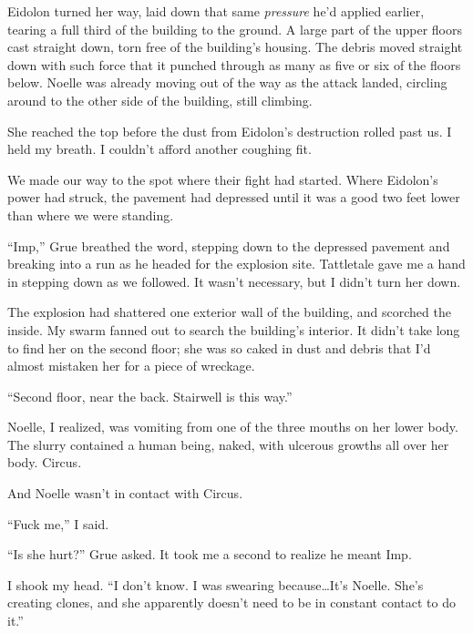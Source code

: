 Eidolon turned her way, laid down that same \emph{pressure }he'd applied earlier, tearing a full  third of the building to the ground.  A large part of the upper floors cast straight down, torn free of the building's housing.  The debris moved straight down with such force that it punched through as many as five or six of the floors below.  Noelle was already moving out of the way as the attack landed, circling around to the other side of the building, still climbing.



She reached the top before the dust from Eidolon's destruction rolled past us.  I held my breath.  I couldn't afford another coughing fit.



We made our way to the spot where their fight had started.  Where Eidolon's power had struck, the pavement had depressed until it was a good two feet lower than where we were standing.



``Imp,'' Grue breathed the word, stepping down to the depressed pavement and breaking into a run as he headed for the explosion site.  Tattletale gave me a hand in stepping down as we followed.  It wasn't necessary, but I didn't turn her down.



The explosion had shattered one exterior wall of the building, and scorched the inside.  My swarm fanned out to search the building's interior.  It didn't take long to find her on the second floor; she was so caked in dust and debris that I'd almost mistaken her for a piece of wreckage.



``Second floor, near the back.  Stairwell is this way.''



Noelle, I realized, was vomiting from one of the three mouths on her lower body.  The slurry contained a human being, naked, with ulcerous growths all over her body.  Circus.



And Noelle wasn't in contact with Circus.



``Fuck me,'' I said.



``Is she hurt?'' Grue asked.  It took me a second to realize he meant Imp.



I shook my head.  ``I don't know.  I was swearing because\ldots It's Noelle.  She's creating clones, and she apparently doesn't need to be in constant contact to do it.''



